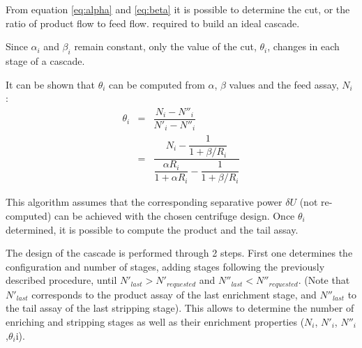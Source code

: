\documentclass{anstrans}
\begin{document}
From equation \eqref{eq:alpha} and \eqref{eq:beta} it is possible to determine the cut, or the ratio of product flow to feed flow.
required to build an ideal cascade.

Since $\alpha_{i}$ and $\beta_{i}$ remain constant, only the value of the cut, $\theta_{i}$, changes in each stage of a cascade.

It can be shown that $\theta_{i}$ can be computed from $\alpha$,
$\beta$ values and the feed assay, $N_{i}$ \cite{ref}:
\begin{eqnarray}
    \theta_{i} &=& \dfrac{N_{i} - N''_{i}}{N'_{i}-N''_{i}}\nonumber\\
           &=& \dfrac{N_{i} - \dfrac{1}{1 + \beta/R_{i}}}{ \dfrac{\alpha R_{i}}{1 + \alpha R_{i}} -
           \dfrac{1}{1 + \beta/R_{i}}}
\end{eqnarray}

This algorithm assumes that the corresponding separative power $\delta U$ (not re-computed) can be
achieved with the chosen centrifuge design. Once $\theta_{i}$ determined, it is possible to
compute the product and the tail assay.

The design of the cascade is performed through 2 steps. First one determines the
configuration and number of stages, adding stages following the previously
described procedure, until $N'_{last} > N'_{requested}$ and $N''_{last} <
N''_{requested}$. (Note that $N'_{last}$ corresponds to the product assay of the
last enrichment stage, and $N''_{last}$ to the tail assay of the last stripping
stage). This allows to determine the number of enriching and stripping stages as
well as their enrichment properties ($N_{i}$, $N'_{i}$,
$N''_{i}$,$\theta_{i}$i).
\end{document}
